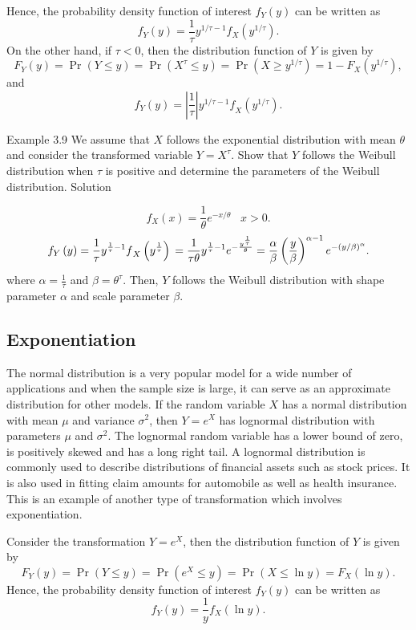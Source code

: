 \documentclass[]{book}
\begin{document}
Hence, the probability density function of interest \(f_{Y}(y)\) can be
written as
\[f_{Y}(y) = \frac{1}{\tau} y^{1/ \tau - 1} f_{X}\left( y^{1/ \tau} \right).\]
On the other hand, if \(\tau < 0\), then the distribution function of
\(Y\) is given by
\[F_{Y}\left( y \right) = \Pr\left( Y \leq y \right) = \Pr\left( X^{\tau} \leq y \right) = \Pr\left( X \geq y^{1/ \tau} \right) = 1 - F_{X}\left( y^{1/ \tau} \right), \]
and
\[f_{Y}(y) = \left| \frac{1}{\tau} \right|{y^{1/ \tau - 1}f}_{X}\left( y^{1/ \tau} \right).\]

Example 3.9 We assume that \(X\) follows the exponential distribution
with mean \(\theta\) and consider the transformed variable
\(Y = X^{\tau}\). Show that \(Y\) follows the Weibull distribution when
\(\tau\) is positive and determine the parameters of the Weibull
distribution. Solution

\[f_{X}(x) = \frac{1}{\theta}e^{- x/ \theta} \ \ \ \, x > 0.\]
\[f_{Y}\left( y \right) = \frac{1}{\tau}{y^{\frac{1}{\tau} - 1}f}_{X}\left( y^{\frac{1}{\tau}} \right) \\
= \frac{1}{\tau \theta }y^{\frac{1}{\tau} - 1}e^{- \frac{y^{\frac{1}{\tau}}}{\theta}} = \frac{\alpha}{\beta}\left( \frac{y}{\beta} \right)^{\alpha - 1}e^{- \left( y/ \beta \right)^{\alpha}}.\]
where \(\alpha = \frac{1}{\tau}\) and \(\beta = \theta^{\tau}\). Then,
\(Y\) follows the Weibull distribution with shape parameter \(\alpha\)
and scale parameter \(\beta\).

\subsection{Exponentiation}\label{exponentiation}

The normal distribution is a very popular model for a wide number of
applications and when the sample size is large, it can serve as an
approximate distribution for other models. If the random variable \(X\)
has a normal distribution with mean \(\mu\) and variance \(\sigma^{2}\),
then \(Y = e^{X}\) has lognormal distribution with parameters \(\mu\)
and \(\sigma^{2}\). The lognormal random variable has a lower bound of
zero, is positively skewed and has a long right tail. A lognormal
distribution is commonly used to describe distributions of financial
assets such as stock prices. It is also used in fitting claim amounts
for automobile as well as health insurance. This is an example of
another type of transformation which involves exponentiation.

Consider the transformation \(Y = e^{X}\), then the distribution
function of \(Y\) is given by
\[F_{Y}\left( y \right) = \Pr\left( Y \leq y \right) = \Pr\left( e^{X} \leq y \right) = \Pr\left( X \leq \ln y \right) = F_{X}\left( \ln y \right).\]
Hence, the probability density function of interest \(f_{Y}(y)\) can be
written as \[f_{Y}(y) = \frac{1}{y}f_{X}\left( \ln y \right).\]
\end{document}
